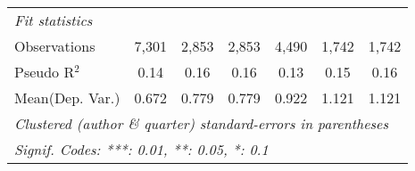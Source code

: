 \begin{tabular}{lcccccc}
   \midrule
   \emph{Fit statistics}\\
   Observations            & 7,301        & 2,853   & 2,853   & 4,490       & 1,742   & 1,742\\  
   Pseudo R$^2$            & 0.14         & 0.16    & 0.16    & 0.13        & 0.15    & 0.16\\  
Mean(Dep. Var.) & 0.672 & 0.779 & 0.779 & 0.922 & 1.121 & 1.121 \\
   \midrule \midrule
   \multicolumn{7}{l}{\emph{Clustered (author \& quarter) standard-errors in parentheses}}\\
   \multicolumn{7}{l}{\emph{Signif. Codes: ***: 0.01, **: 0.05, *: 0.1}}\\
\end{tabular}
\par\endgroup

